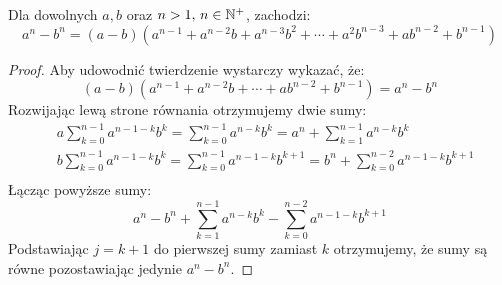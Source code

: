 \begin{theorem}
  Dla dowolnych $a, b$ oraz $n > 1, \, n \in \mathbb{N}^+$, zachodzi:
  \[
    a^n - b^n = \left( a - b \right) \left( a^{n - 1} + a^{n - 2}b + a^{n - 3}b^2 + \cdots + a^2b^{n - 3} + ab^{n - 2} + b^{n - 1}\right) 
  \]
\end{theorem}

\begin{proof}
  Aby udowodnić twierdzenie wystarczy wykazać, że:
  \[
    \left( a - b \right) \left( a^{n - 1} + a^{n - 2}b + \cdots + ab^{n - 2} + b^{n - 1} \right) = a^n - b^n
  \]
  Rozwijając lewą strone równania otrzymujemy dwie sumy:
  \begin{align*}
    &a \sum_{k = 0}^{n - 1}{a^{n - 1 - k}b^{k}} = \sum_{k = 0}^{n - 1}{a^{n - k}b^{k}} = a^n + \sum_{k = 1}^{n - 1}{a^{n - k}b^k} \\
    &b \sum_{k = 0}^{n - 1}{a^{n - 1 - k}b^{k}} = \sum_{k = 0}^{n - 1}{a^{n - 1 - k}b^{k + 1}} = b^n + \sum_{k = 0}^{n - 2}{a^{n - 1 -k}b^{k + 1}}\\
  \end{align*}
  Łącząc powyższe sumy:
  \[
    a^n - b^n + \sum_{k = 1}^{n - 1}{a^{n - k}b^k} - \sum_{k = 0}^{n - 2}{a^{n - 1 - k}b^{k + 1}}
  \]
  Podstawiając $j = k + 1$ do pierwszej sumy zamiast $k$ otrzymujemy, że sumy są równe pozostawiając jedynie $a^n - b^n$.
\end{proof}
